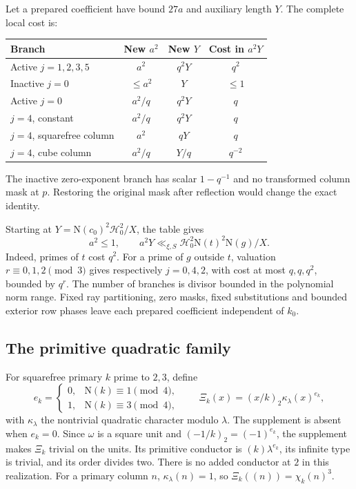 \documentclass[11pt]{article}
\numberwithin{equation}{section}
\theoremstyle{definition}
\theoremstyle{remark}
\newcommand{\N}{\mathrm N}
\begin{document}
Let a prepared coefficient have bound \(27a\) and auxiliary length
\(Y\). The complete local cost is:
\begin{center}\small
\begin{tabular}{@{}lccc@{}}
\toprule
Branch & New \(a^2\) & New \(Y\) & Cost in \(a^2Y\)\\
\midrule
Active \(j=1,2,3,5\) & \(a^2\) & \(q^2Y\) & \(q^2\)\\
Inactive \(j=0\) & \(\le a^2\) & \(Y\) & \(\le1\)\\
Active \(j=0\) & \(a^2/q\) & \(q^2Y\) & \(q\)\\
\(j=4\), constant & \(a^2/q\) & \(q^2Y\) & \(q\)\\
\(j=4\), squarefree column & \(a^2\) & \(qY\) & \(q\)\\
\(j=4\), cube column & \(a^2/q\) & \(Y/q\) & \(q^{-2}\)\\
\bottomrule
\end{tabular}
\end{center}
The inactive zero-exponent branch has scalar \(1-q^{-1}\) and
no transformed column mask at \(p\). Restoring the original mask
after reflection would change the exact identity.

Starting at \(Y=\N(c_0)^2\mathcal H_0^2/X\), the table gives
\begin{equation}\label{eq:cost}
 a^2\le1,\qquad
 a^2Y\ll_{\xi,S}\mathcal H_0^2\N(t)^2\N(g)/X.
\end{equation}
Indeed, primes of \(t\) cost \(q^2\). For a prime of \(g\) outside
\(t\), valuation \(r\equiv0,1,2\pmod3\) gives respectively
\(j=0,4,2\), with cost at most \(q,q,q^2\), bounded by \(q^r\).
The number of branches is divisor bounded in the polynomial norm
range. Fixed ray partitioning, zero masks, fixed substitutions and
bounded exterior row phases leave each prepared coefficient
independent of \(k_0\).

\subsection{The primitive quadratic family}

For squarefree primary \(k\) prime to \(2,3\), define
\[
 e_k=\begin{cases}0,&\N(k)\equiv1\pmod4,\\1,&\N(k)\equiv3\pmod4,\end{cases}
 \qquad
 \Xi_k(x)=(x/k)_2\kappa_\lambda(x)^{e_k},
\]
with \(\kappa_\lambda\) the nontrivial quadratic character modulo
\(\lambda\). The supplement is absent when \(e_k=0\).
Since \(\omega\) is a square unit and
\((-1/k)_2=(-1)^{e_k}\), the supplement makes \(\Xi_k\)
trivial on the units. Its primitive conductor is
\((k)\lambda^{e_k}\), its infinite type is trivial, and its order
divides two. There is no added conductor at \(2\) in this realization.
For a primary column \(n\), \(\kappa_\lambda(n)=1\), so
\(\Xi_k((n))=\chi_k(n)^3\).
\end{document}

